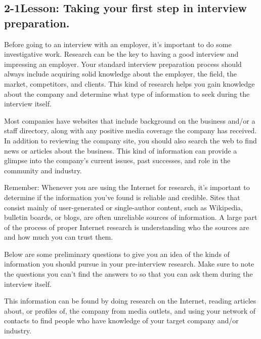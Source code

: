 \pagebreak \subsection*{2-1\quad Lesson: Taking your first step in interview preparation.}
Before going to an interview with an employer, it's important to do some investigative work. Research can be the key to having a good interview and impressing an employer. Your standard interview preparation process should always include acquiring solid knowledge about the employer, the field, the market, competitors, and clients. This kind of research helps you gain knowledge about the company and determine what type of information to seek during the interview itself.

Most companies have websites that include background on the business and/or a staff directory, along with any positive media coverage the company has received. In addition to reviewing the company site, you should also search the web to find news or articles about the business. This kind of information can provide a glimpse into the company's current issues, past successes, and role in the community and industry.

Remember: Whenever you are using the Internet for research, it's important to determine if the information you've found is reliable and credible. Sites that consist mainly of user-generated or single-author content, such as Wikipedia, bulletin boards, or blogs, are often unreliable sources of information. A large part of the process of proper Internet research is understanding who the sources are and how much you can trust them.

Below are some preliminary questions to give you an idea of the kinds of information you should pursue in your pre-interview research. Make sure to note the questions you can't find the answers to so that you can ask them during the interview itself.

This information can be found by doing research on the Internet, reading articles about, or profiles of, the company from media outlets, and using your network of contacts to find people who have knowledge of your target company and/or industry.


